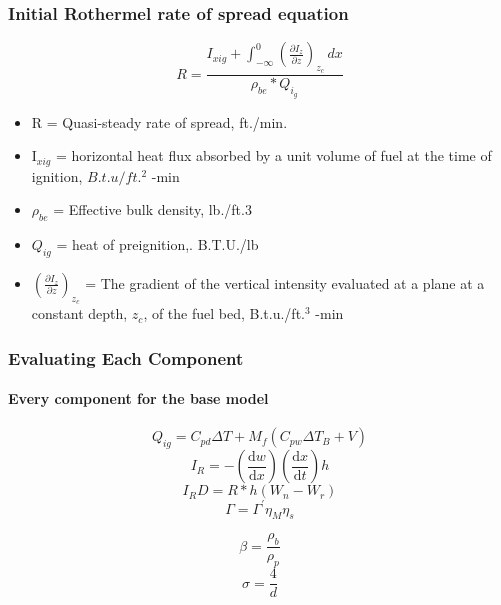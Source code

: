 \documentclass{beamer}
\begin{document}
	\begin{frame}
		\frametitle{Initial Rothermel rate of spread equation}
				\begin{equation}
					R = \frac {I_{xig} + \int_{-\infty}^{0} (\frac {\partial I_{z}} {\partial z})_{z_c}\,dx }{\rho_{be} * Q_{i_g}}
					\label{Equation 1}
				\end{equation}
			\begin{itemize}
			\setlength{\itemsep}{5mm}
		\item R = Quasi-steady rate of spread, ft./min. \\

		\item I$_{xig}$ = horizontal heat flux absorbed by a unit volume of fuel at the time of ignition, $B.t.u/ft.^2$ -min \\

		\item $\rho_{be}$ = Effective bulk density, lb./ft.3 \\

		\item $Q_{ig}$ = heat of preignition,. B.T.U./lb \\

		\item $(\frac {\partial {I_z}} {\partial z})_{z_c}$ = The gradient of the vertical intensity evaluated at a plane at a constant depth, $z_c$, of the fuel bed, B.t.u./ft.$^3$ -min \\
		\end{itemize}
	\end{frame}

	\begin{frame}
		\frametitle{Evaluating Each Component}
	\framesubtitle{Every component for the base model}
	\begin{equation}
	Q_{ig} = C_{pd}\Delta T + M_f (C_{pw} \Delta T_B + V)
	\label{qig}
\end{equation}
	\begin{equation}
	\label{I_R}
	I_R = - (\frac {\mathrm {d}w} {\mathrm{d} x}) (\frac {\mathrm {d}x} {\mathrm{d} t}) h 
	\end{equation}
\begin{equation}
	\label{Equation 5}
	I_R D = R*h (W_n - W_r)
	\end{equation}
\begin{equation}
	\label{reaction velocity}
	\Gamma = \Gamma ^ {'} \eta _ M \eta _ s
\end{equation}

	 \begin{equation}
 	\beta = \frac {\rho _ b } {\rho _ p} 
 	\label{beta_rothermel}
 \end{equation}
\begin{equation}
	\label{Equation 9}
	\sigma = \frac {4} {d}
\end{equation}

	\end{frame}
	
\end{document}
